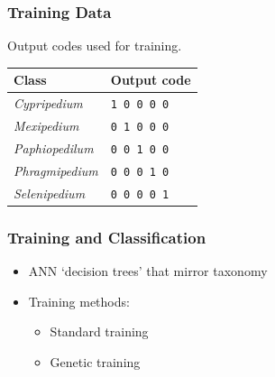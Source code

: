 \documentclass[]{beamer}
\begin{document}
    \begin{frame}
        \frametitle{Training Data}

        Output codes used for training.

        \begin{table}[h]\scriptsize
            \begin{center}
            \begin{tabular}{ll}
            \toprule
            \textbf{Class} & \textbf{Output code} \\
            \midrule
            \textit{Cypripedium}    & \texttt{1 0 0 0 0} \\
            \textit{Mexipedium}     & \texttt{0 1 0 0 0} \\
            \textit{Paphiopedilum}  & \texttt{0 0 1 0 0} \\
            \textit{Phragmipedium}  & \texttt{0 0 0 1 0} \\
            \textit{Selenipedium}   & \texttt{0 0 0 0 1} \\
            \bottomrule
            \end{tabular}
            \end{center}
        \end{table}
    \end{frame}

    \begin{frame}
        \frametitle{Training and Classification}

        \begin{itemize}
            \item ANN `decision trees' that mirror taxonomy{\newline}


            \vspace{5 mm}

        \item Training methods:
            \begin{itemize}
                \item Standard training
                \item Genetic training
            \end{itemize}
        \end{itemize}
    \end{frame}
\end{document}
